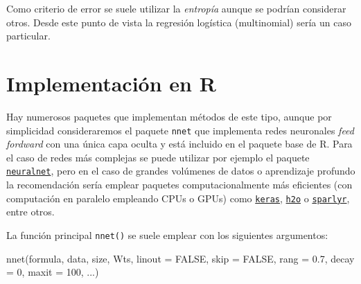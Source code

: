 \documentclass[
]{book}
\newenvironment{Shaded}{\begin{snugshade}}{\end{snugshade}}
\newcommand{\AttributeTok}[1]{\textcolor[rgb]{0.77,0.63,0.00}{#1}}
\newcommand{\ConstantTok}[1]{\textcolor[rgb]{0.00,0.00,0.00}{#1}}
\newcommand{\DecValTok}[1]{\textcolor[rgb]{0.00,0.00,0.81}{#1}}
\newcommand{\FloatTok}[1]{\textcolor[rgb]{0.00,0.00,0.81}{#1}}
\newcommand{\FunctionTok}[1]{\textcolor[rgb]{0.00,0.00,0.00}{#1}}
\newcommand{\NormalTok}[1]{#1}
\theoremstyle{break}
\theoremstyle{definition}
\theoremstyle{definition}
\theoremstyle{definition}
\theoremstyle{definition}
\theoremstyle{remark}
\begin{document}
Como criterio de error se suele utilizar la \emph{entropía} aunque se podrían considerar otros.
Desde este punto de vista la regresión logística (multinomial) sería un caso particular.

\hypertarget{implementaciuxf3n-en-r-2}{%
\section{Implementación en R}\label{implementaciuxf3n-en-r-2}}

Hay numerosos paquetes que implementan métodos de este tipo, aunque por simplicidad consideraremos el paquete \texttt{nnet} que implementa redes neuronales \emph{feed fordward} con una única capa oculta y está incluido en el paquete base de R.
Para el caso de redes más complejas se puede utilizar por ejemplo el paquete \href{https://CRAN.R-project.org/package=neuralnet}{\texttt{neuralnet}}, pero en el caso de grandes volúmenes de datos o aprendizaje profundo la recomendación sería emplear paquetes computacionalmente más eficientes (con computación en paralelo empleando CPUs o GPUs) como \href{https://keras.rstudio.com}{\texttt{keras}}, \href{https://github.com/h2oai/h2o-3}{\texttt{h2o}} o \href{https://spark.rstudio.com/}{\texttt{sparlyr}}, entre otros.

La función principal \texttt{nnet()} se suele emplear con los siguientes argumentos:

\begin{Shaded}
\begin{Highlighting}[]
\FunctionTok{nnet}\NormalTok{(formula, data, size, Wts, }\AttributeTok{linout =} \ConstantTok{FALSE}\NormalTok{, }\AttributeTok{skip =} \ConstantTok{FALSE}\NormalTok{, }
     \AttributeTok{rang =} \FloatTok{0.7}\NormalTok{, }\AttributeTok{decay =} \DecValTok{0}\NormalTok{, }\AttributeTok{maxit =} \DecValTok{100}\NormalTok{, ...)}
\end{Highlighting}
\end{Shaded}
\end{document}
